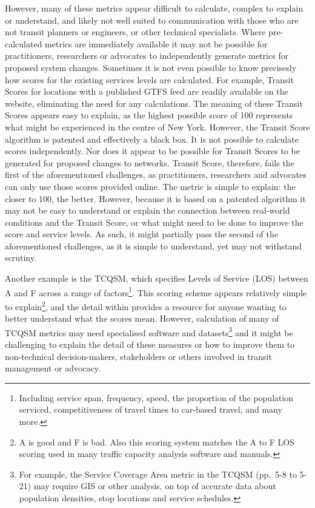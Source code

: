 \documentclass[preprint, 3p,
authoryear]{elsarticle} %
\begin{document}
However, many of these metrics appear difficult to calculate, complex to
explain or understand, and likely not well suited to communication with
those who are not transit planners or engineers, or other technical
specialists. Where pre-calculated metrics are immediately available it
may not be possible for practitioners, researchers or advocates to
independently generate metrics for proposed system changes. Sometimes it
is not even possible to know precisesly how scores for the existing
services levels are calculated. For example, Transit Scores for
locations with a published GTFS feed are readily available on the
\citet{WalkScore:2023tg} website, eliminating the need for any
calculations. The meaning of these Transit Scores appears easy to
explain, as the highest possible score of 100 represents what might be
experienced in the centre of New York. However, the Transit Score
algorithm is patented and effectively a black box. It is not possible to
calculate scores independently. Nor does it appear to be possible for
Transit Scores to be generated for proposed changes to networks. Transit
Score, therefore, fails the first of the aforementioned challenges, as
practitioners, researchers and advocates can only use those scores
provided online. The metric is simple to explain: the closer to 100, the
better. However, because it is based on a patented algorithm it may not
be easy to understand or explain the connection between real-world
conditions and the Transit Score, or what might need to be done to
improve the score and service levels. As such, it might partially pass
the second of the aforementioned challenges, as it is simple to
understand, yet may not withstand scrutiny.

Another example is the TCQSM, which specifies Levels of Service (LOS)
between A and F across a range of factors\footnote{ Including service
  span, frequency, speed, the proportion of the population serviced,
  competitiveness of travel times to car-based travel, and many more.}.
This scoring scheme appears relatively simple to explain\footnote{ A is
  good and F is bad. Also this scoring system matches the A to F LOS
  scoring used in many traffic capacity analysis software and manuals.},
and the detail within \citet{TCQSM:2013} provides a resource for anyone
wanting to better understand what the scores mean. However, calculation
of many of TCQSM metrics may need specialised software and
datasets\footnote{ For example, the Service Coverage Area metric in the
  TCQSM (pp.~5-8 to 5-21) may require GIS or other analysis, on top of
  accurate data about population densities, stop locations and service
  schedules.} and it might be challenging to explain the detail of these
measures or how to improve them to non-technical decision-makers,
stakeholders or others involved in transit management or advocacy.
\end{document}
